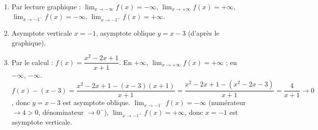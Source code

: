 \begin{enumerate}[label=\arabic*)]
\item Par lecture graphique : $\displaystyle\lim_{x\to -\infty} f(x)=-\infty$, $\displaystyle\lim_{x\to +\infty} f(x)=+\infty$, $\displaystyle\lim_{x\to -1^-} f(x)=-\infty$, $\displaystyle\lim_{x\to -1^+} f(x)=+\infty$.
\item Asymptote verticale $x=-1$, asymptote oblique $y=x-3$ (d'après le graphique).
\item Par le calcul : $f(x)=\dfrac{x^2-2x+1}{x+1}$. En $+\infty$, $\displaystyle\lim_{x\to +\infty} f(x)=+\infty$ ; en $-\infty$, $-\infty$. $f(x)-(x-3)=\dfrac{x^2-2x+1-(x-3)(x+1)}{x+1}=\dfrac{x^2-2x+1-(x^2-2x-3)}{x+1}=\dfrac{4}{x+1}\to 0$, donc $y=x-3$ est asymptote oblique. $\displaystyle\lim_{x\to -1^-} f(x)=-\infty$ (numérateur $\to 4>0$, dénominateur $\to 0^-$), $\displaystyle\lim_{x\to -1^+} f(x)=+\infty$, donc $x=-1$ est asymptote verticale.
\end{enumerate}